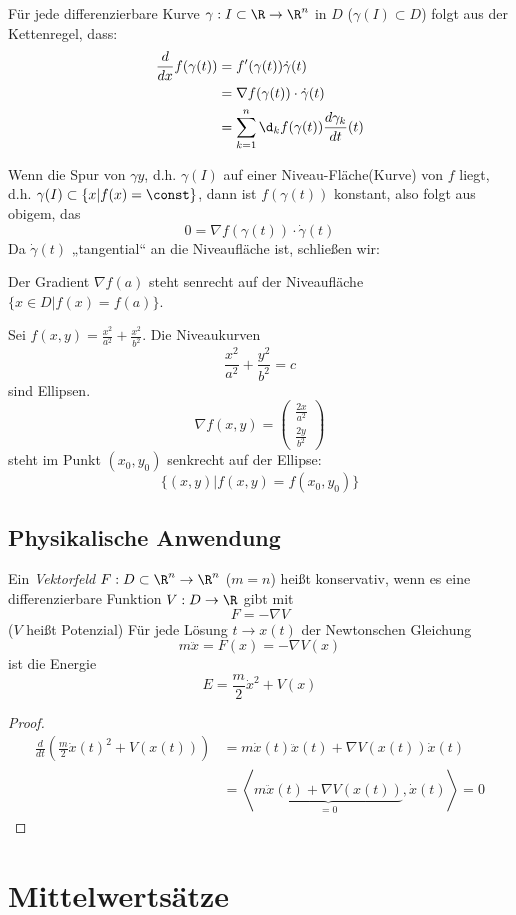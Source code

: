 \documentclass{mycourse}
\begin{document}
Für jede differenzierbare Kurve $\gamma:I\subset \R\to \R^n$ in $D$ ($\gamma(I)\subset D$) folgt aus der Kettenregel, dass:
\begin{align*}
\frac d{dx}f(\gamma(t))&=f'(\gamma(t))\dot\gamma(t)\\
&=\nabla f(\gamma(t))\cdot \dot\gamma(t)\\
&=\sum_{k=1}^n\d_kf(\gamma(t))\frac{d\gamma_k}{dt}(t)
\end{align*}

Wenn die Spur von $\gamma y$, d.h. $\gamma(I)$ auf einer Niveau-Fläche(Kurve) von $f$ liegt, d.h.
$\gamma(I)\subset\{x|f(x)=\const\}$, dann ist $f(\gamma(t))$ konstant, also folgt aus obigem, das
\[
0=\nabla f(\gamma(t))\cdot \dot\gamma(t)
\]
Da $\dot\gamma(t)$ „tangential“ an die Niveaufläche ist, schließen wir:

Der Gradient $\nabla f(a)$ steht senrecht auf der Niveaufläche $\{x\in D|f(x)=f(a)\}$.

\begin{ex*}
Sei $f(x,y)=\frac{x^2}{a^2}+\frac{x^2}{b^2}$.
Die Niveaukurven 
\[
\frac{x^2}{a^2}+\frac{y^2}{b^2}=c
\]
sind Ellipsen.
\[
	\nabla f(x,y)=\begin{pmatrix}\frac{2x}{a^2} \\[0.3em] \frac{2y}{b^2}\end{pmatrix}
\]
steht im Punkt $(x_0,y_0)$ senkrecht auf der Ellipse:
\[
\{(x,y)|f(x,y)=f(x_0,y_0)\}
\]
\end{ex*}

\subsection*{Physikalische Anwendung}

Ein \emph{Vektorfeld} $F:D\subset \R^n\to \R^n$ ($m=n$) heißt konservativ, wenn es eine differenzierbare Funktion
$V:D\to \R$ gibt mit
\[
F=-\nabla V
\]
($V$ heißt Potenzial)
Für jede Lösung $t\to x(t)$ der Newtonschen Gleichung
\[
m\ddot x=F(x)=-\nabla V(x)
\]
ist die Energie
\[
E=\frac m2 \dot x^2+V(x)
\]
\begin{proof}
\begin{align*}
\frac{d}{dt}\left(\frac m2 \dot x(t)^2+V(x(t))\right) &= m\dot x(t)\ddot x(t) + \nabla V(x(t))\dot x(t)\\
&=\left<\underbrace{m\ddot x(t)+\nabla V(x(t))}_{=0}, \dot x(t)\right> = 0
\end{align*}
\end{proof}

\section{Mittelwertsätze}
\end{document}
